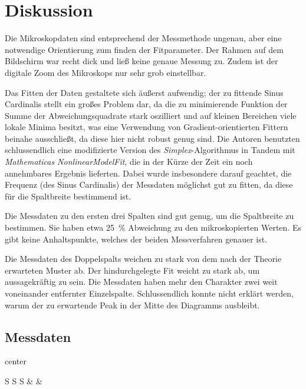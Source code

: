 \section{Diskussion}
\label{sec:Diskussion}
  Die Mikroskopdaten sind entsprechend der Messmethode ungenau, aber eine notwendige Orientierung zum finden der Fitparameter.
  Der Rahmen auf dem Bildschirm war recht dick und ließ keine genaue Messung zu. Zudem ist der digitale Zoom des
  Mikroskops nur sehr grob einstellbar.

  Das Fitten der Daten gestaltete sich äußerst aufwendig; der zu fittende Sinus Cardinalis stellt ein großes Problem dar,
	da die zu minimierende Funktion der Summe der Abweichungsquadrate stark oszilliert und auf kleinen Bereichen viele
	lokale Minima besitzt, was eine Verwendung von Gradient-orientierten Fittern beinahe ausschließt, da diese hier
	nicht robust genug sind.
	Die Autoren benutzten schlussendlich eine modifizierte Version des \emph{Simplex}-Algorithmus in Tandem mit
	\emph{Mathematicas NonlinearModelFit}, die in der Kürze der Zeit ein noch annehmbares Ergebnis lieferten. Dabei wurde
	insbesondere darauf geachtet, die Frequenz (des Sinus Cardinalis) der Messdaten möglichst gut zu fitten, da diese für die Spaltbreite bestimmend
	ist.

	Die Messdaten zu den ersten drei Spalten sind gut genug, um die Spaltbreite zu bestimmen. Sie haben etwa 25~\% Abweichung
	zu den mikroskopierten Werten. Es gibt keine Anhaltspunkte, welches der beiden Messverfahren genauer ist.

	Die Messdaten des Doppelspalts weichen zu stark von dem nach der Theorie erwarteten Muster ab. Der hindurchgelegte Fit
	weicht zu stark ab, um aussagekräftig zu sein. Die Messdaten haben mehr den Charakter zwei weit voneinander entfernter
	Einzelspalte. Schlussendlich konnte nicht erklärt werden, warum der zu erwartende Peak in der Mitte des Diagramms ausbleibt.


\subsection{Messdaten} %
\label{sub:messdaten}

\begin{table}
\footnotesize
	\centering
  \caption{Messdaten zu Spalt 1.}
  \label{tab:fit}
  \begin{adjustbox}{center}
		\tabcolsep=0.11cm
  \begin{tabular}{
      S
      S
      S}
   \toprule
    &
    &
    \\
   \midrule
   \bottomrule
  \end{tabular}
  \end{adjustbox}
\end{table}

